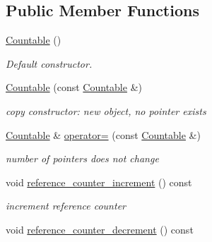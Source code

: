 \subsection*{Public Member Functions}
\begin{DoxyCompactItemize}
\item 
\hypertarget{classhdnum_1_1Countable_a45b6c9588aad15524d23935086829847}{
\hyperlink{classhdnum_1_1Countable_a45b6c9588aad15524d23935086829847}{Countable} ()}
\label{classhdnum_1_1Countable_a45b6c9588aad15524d23935086829847}

\begin{DoxyCompactList}\small\item\em Default constructor. \item\end{DoxyCompactList}\item 
\hypertarget{classhdnum_1_1Countable_a1bf12e6a87ae66f1b310a9c202fd9844}{
\hyperlink{classhdnum_1_1Countable_a1bf12e6a87ae66f1b310a9c202fd9844}{Countable} (const \hyperlink{classhdnum_1_1Countable}{Countable} \&)}
\label{classhdnum_1_1Countable_a1bf12e6a87ae66f1b310a9c202fd9844}

\begin{DoxyCompactList}\small\item\em copy constructor: new object, no pointer exists \item\end{DoxyCompactList}\item 
\hypertarget{classhdnum_1_1Countable_af7d443a1f3195b7b456d47f5f76f5fcf}{
\hyperlink{classhdnum_1_1Countable}{Countable} \& \hyperlink{classhdnum_1_1Countable_af7d443a1f3195b7b456d47f5f76f5fcf}{operator=} (const \hyperlink{classhdnum_1_1Countable}{Countable} \&)}
\label{classhdnum_1_1Countable_af7d443a1f3195b7b456d47f5f76f5fcf}

\begin{DoxyCompactList}\small\item\em number of pointers does not change \item\end{DoxyCompactList}\item 
\hypertarget{classhdnum_1_1Countable_aa8116fca1ddfee3971847c55f9fe15bc}{
void \hyperlink{classhdnum_1_1Countable_aa8116fca1ddfee3971847c55f9fe15bc}{reference\_\-counter\_\-increment} () const }
\label{classhdnum_1_1Countable_aa8116fca1ddfee3971847c55f9fe15bc}

\begin{DoxyCompactList}\small\item\em increment reference counter \item\end{DoxyCompactList}\item 
\hypertarget{classhdnum_1_1Countable_a02c3a28bb4d4bfc74615fb5648e250dc}{
void \hyperlink{classhdnum_1_1Countable_a02c3a28bb4d4bfc74615fb5648e250dc}{reference\_\-counter\_\-decrement} () const }
\label{classhdnum_1_1Countable_a02c3a28bb4d4bfc74615fb5648e250dc}


\end{DoxyCompactItemize}
